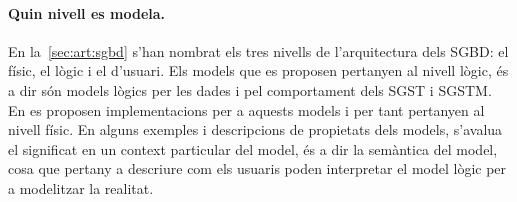 






\paragraph{Quin nivell es modela.}
En la~\autoref{sec:art:sgbd} s'han nombrat els tres nivells de
l'arquitectura dels \gls {SGBD}: el físic, el lògic i el d'usuari.
Els models que es proposen pertanyen al nivell lògic, és a dir són
models lògics per les dades i pel comportament dels \gls{SGST} i
\gls{SGSTM}.  En  es
proposen implementacions per a aquests models i per tant pertanyen al
nivell físic.  En alguns exemples i descripcions de propietats dels
models, s'avalua el significat en un context particular del model, és
a dir la semàntica del model, cosa que pertany a descriure com els
usuaris poden interpretar el model lògic per a modelitzar la realitat.





